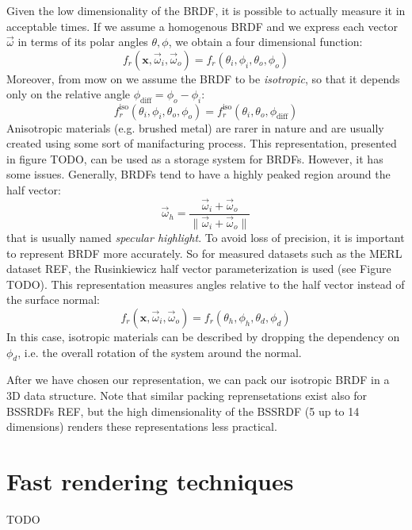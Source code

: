 Given the low dimensionality of the BRDF, it is possible to actually measure it in acceptable times. If we assume a homogenous BRDF and we express each vector $\vec{\omega}$ in terms of its polar angles $\theta, \phi$, we obtain a four dimensional function:
\begin{equation*}
f_r(\mathbf{x}, \vec{\omega}_i,  \vec{\omega}_o) = f_r(\theta_i, \phi_i, \theta_o, \phi_o)
\end{equation*}
Moreover, from mow on we assume the BRDF to be \emph{isotropic}, so that it depends only on the relative angle $\phi_\text{diff} = \phi_o - \phi_i$:
\begin{equation*}
f_r^\text{iso}(\theta_i, \phi_i, \theta_o, \phi_o) = f_r^\text{iso}(\theta_i, \theta_o, \phi_\text{diff})
\end{equation*}
Anisotropic materials (e.g. brushed metal) are rarer in nature and are usually created using some sort of manifacturing process.
This representation, presented in figure TODO, can be used as a storage system for BRDFs. However, it has some issues. Generally, BRDFs tend to have a highly peaked region around the half vector:
\begin{equation*}\vec{\omega}_h = \frac{\vec{\omega}_i + \vec{\omega}_o}{\|\vec{\omega}_i + \vec{\omega}_o\|}
\end{equation*}
that is usually named \emph{specular highlight}. To avoid loss of precision, it is important to represent BRDF more accurately. So for measured datasets such as the MERL dataset REF, the Rusinkiewicz half vector parameterization is used (see Figure TODO). This representation measures angles relative to the half vector instead of the surface normal:
\begin{equation*}
f_r(\mathbf{x}, \vec{\omega}_i,  \vec{\omega}_o) = f_r(\theta_h, \phi_h, \theta_d, \phi_d)
\end{equation*}
In this case,  isotropic materials can be described by dropping the dependency on $\phi_d$, i.e. the overall rotation of the system around the normal.

After we have chosen our representation, we can pack our isotropic BRDF in a 3D data structure. Note that similar packing reprensetations exist also for BSSRDFs REF, but the high dimensionality of the BSSRDF (5 up to 14 dimensions) renders these representations less practical.

\section{Fast rendering techniques} 
TODO

